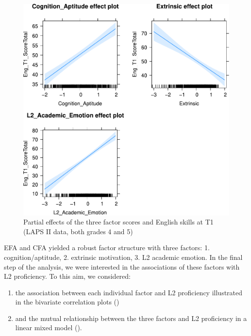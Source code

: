 \documentclass[output=paper]{langsci/langscibook}
\begin{document}
\begin{figure}
\includegraphics[width=.75\textwidth]{figures/Figure3.3.pdf}
\caption{\label{fig:03:3}Partial effects of the three factor scores and English skills at T1 (LAPS II data, both grades 4 and 5)}
\end{figure}


EFA and CFA yielded a robust factor structure with three factors: 1. cognition/aptitude, 2. extrinsic motivation, 3. L2 academic emotion. In the final step of the analysis, we were interested in the associations of these factors with L2 proficiency. To this aim, we considered:

\begin{enumerate}
\item the association between each individual factor and L2 proficiency illustrated in the bivariate correlation plots ()
\item and the mutual relationship between the three factors and L2 proficiency in a linear mixed model ().
\end{enumerate}
\end{document}
